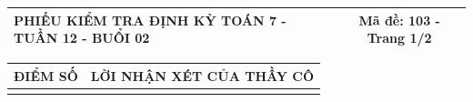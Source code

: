 \documentclass[12pt,a4paper]{article}
\begin{document}
\newpage
\noindent
\begin{tabularx}{\linewidth}{|X|c|}
\hline
\textbf{PHIẾU KIỂM TRA ĐỊNH KỲ TOÁN 7 - TUẦN 12 - BUỔI 02} & \textbf{Mã đề: 103 - Trang 1/2} \\
\hline
\end{tabularx}

\vspace{1.0mm}

\noindent
\begin{tabularx}{\linewidth}{|p{3.2cm}|X|}
\hline
\centering\textbf{ĐIỂM SỐ} & \centering\textbf{LỜI NHẬN XÉT CỦA THẦY CÔ} \tabularnewline
\hline
\rule{0pt}{1.8cm} & \tabularnewline
\hline
\end{tabularx}
\end{document}
